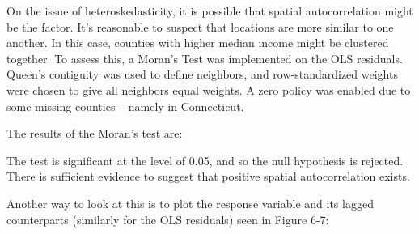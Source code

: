 \documentclass[
]{article}
\begin{document}
\newpage

On the issue of heteroskedasticity, it is possible that spatial
autocorrelation might be the factor. It's reasonable to suspect that
locations are more similar to one another. In this case, counties with
higher median income might be clustered together. To assess this, a
Moran's Test was implemented on the OLS residuals. Queen's contiguity
was used to define neighbors, and row-standardized weights were chosen
to give all neighbors equal weights. A zero policy was enabled due to
some missing counties -- namely in Connecticut.

The results of the Moran's test are:

\begin{table}[H]
\renewcommand{\arraystretch}{1.3} %
\setlength{\tabcolsep}{12pt} %
\centering
\caption{Global OLS Residual Moran's I Test Results}
\label{tab:global_ols_morans_i}
\end{table}

The test is significant at the level of 0.05, and so the null hypothesis
is rejected. There is sufficient evidence to suggest that positive
spatial autocorrelation exists.

Another way to look at this is to plot the response variable and its
lagged counterparts (similarly for the OLS residuals) seen in Figure
6-7:
\end{document}
